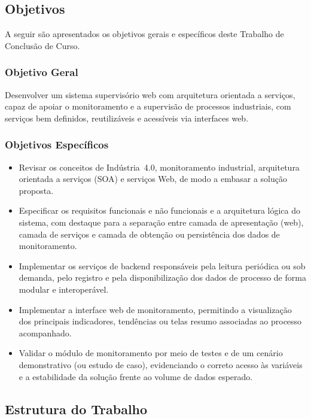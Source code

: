 \subsection{Objetivos}

\par A seguir são apresentados os objetivos gerais e específicos deste Trabalho de Conclusão de Curso.

\subsubsection{Objetivo Geral}

\par Desenvolver um sistema supervisório web com arquitetura orientada a serviços, capaz de apoiar o monitoramento e a supervisão de processos industriais, com serviços bem definidos, reutilizáveis e acessíveis via interfaces web.

\subsubsection{Objetivos Específicos}

\begin{itemize}
    \item Revisar os conceitos de Indústria~4.0, monitoramento industrial, arquitetura orientada a serviços (SOA) e serviços Web, de modo a embasar a solução proposta.
    \item Especificar os requisitos funcionais e não funcionais e a arquitetura lógica do sistema, com destaque para a separação entre camada de apresentação (web), camada de serviços e camada de obtenção ou persistência dos dados de monitoramento.
    \item Implementar os serviços de backend responsáveis pela leitura periódica ou sob demanda, pelo registro e pela disponibilização dos dados de processo de forma modular e interoperável.
    \item Implementar a interface web de monitoramento, permitindo a visualização dos principais indicadores, tendências ou telas resumo associadas ao processo acompanhado.
    \item Validar o módulo de monitoramento por meio de testes e de um cenário demonstrativo (ou estudo de caso), evidenciando o correto acesso às variáveis e a estabilidade da solução frente ao volume de dados esperado.
\end{itemize}

\subsection{Estrutura do Trabalho}

